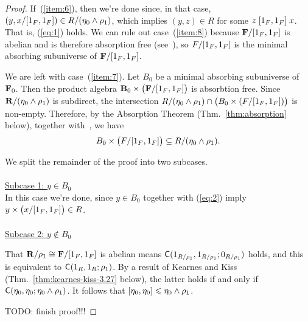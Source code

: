 \begin{proof}
If~(\ref{item:6}), then we're done since, in that case,
$(y, x/[1_{F},1_{F}]) \in R/(\eta_0 \wedge \rho_1)$,
which implies $(y, z) \in R$ for some $z \mathrel{[1_{F}, 1_{F}]} x$.
That is, (\ref{eq:1}) holds.
We can rule out case~(\ref{item:8}) because $\mathbf{F}/[1_{F}, 1_{F}]$ is abelian and
is therefore absorption free (see~\cite{MR3374664}),  %
so $F/[1_{F}, 1_{F}]$ is the minimal absorbing subuniverse of $\mathbf{F}/[1_{F}, 1_{F}]$.


We are left with case~(\ref{item:7}).
Let $B_0$ be a minimal absorbing subuniverse of $\mathbf{F}_0$.
Then the product algebra $\mathbf{B}_0\times \bigl(\mathbf{F}/[1_{F}, 1_{F}]\bigr)$ is
absorbtion free.
Since $\mathbf{R}/(\eta_0 \wedge \rho_1)$ is subdirect, the intersection
$R/(\eta_0 \wedge \rho_1) \cap \bigl(B_0 \times (F/[1_{F}, 1_{F}])\bigr)$ is
non-empty. Therefore, by the Absorption Theorem (Thm.~\ref{thm:absorption}
below), together with~\cite[Lemmas~4.7, 4.9, 4.11, 4.12]{Bergman-DeMeo-2016},
we have
\begin{equation}
  \label{eq:2}
B_0 \times \bigl(F/[1_{F}, 1_{F}]\bigr) \subseteq R/(\eta_0 \wedge \rho_1).
\end{equation}

We split the remainder of the proof into two subcases.\\
\\
\noindent \underline{Subcase 1: $y\in B_0$}\\[5pt]
In this case we're done, since $y\in B_0$ together with (\ref{eq:2}) imply
${y} \times \bigl(x/[1_{F}, 1_{F}]\bigr) \in R$.\\
\\
\noindent \underline{Subcase 2: $y\notin B_0$}\\[5pt]



\bigskip

\bigskip

That $\mathbf{R}/\rho_1 \cong \mathbf{F}/[1_{F},1_{F}]$ is abelian means
$\mathsf{C}(1_{R/\rho_1}, 1_{R/\rho_1}; 0_{R/\rho_1})$ holds, and this is equivalent to
$\mathsf{C}(1_R, 1_R; \rho_1)$. By a result of Kearnes and Kiss
(Thm.~\ref{thm:kearnes-kiss-3.27} below), the latter
holds if and only if $\mathsf{C}(\eta_0, \eta_0; \eta_0\wedge \rho_1)$.
It follows that $[\eta_0, \eta_0]\leqslant \eta_0 \wedge \rho_1$.
\bigskip

\noindent TODO: finish proof!!!

\vfill

\end{proof}

